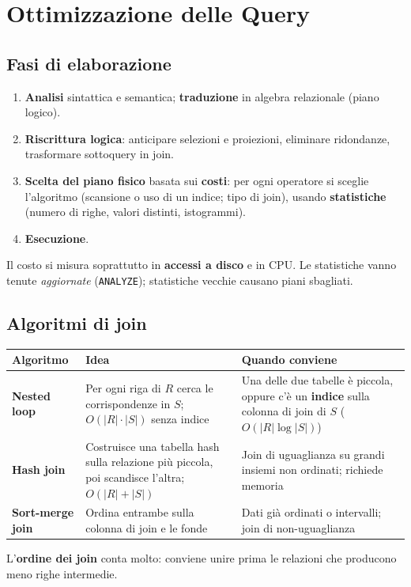 \section{Ottimizzazione delle Query}

\subsection{Fasi di elaborazione}
\begin{enumerate}
    \item \textbf{Analisi} sintattica e semantica; \textbf{traduzione} in algebra relazionale (piano logico).
    \item \textbf{Riscrittura logica}: anticipare selezioni e proiezioni, eliminare ridondanze, trasformare sottoquery in join.
    \item \textbf{Scelta del piano fisico} basata sui \textbf{costi}: per ogni operatore si sceglie l'algoritmo (scansione o uso di un indice; tipo di join), usando \textbf{statistiche} (numero di righe, valori distinti, istogrammi).
    \item \textbf{Esecuzione}.
\end{enumerate}
Il costo si misura soprattutto in \textbf{accessi a disco} e in CPU. Le statistiche vanno tenute \emph{aggiornate} (\texttt{ANALYZE}); statistiche vecchie causano piani sbagliati.

\subsection{Algoritmi di join}
\begin{center}
\small
\begin{tabularx}{\textwidth}{@{}>{\raggedright\arraybackslash}p{3cm}XX@{}}
\toprule
\textbf{Algoritmo} & \textbf{Idea} & \textbf{Quando conviene} \\
\midrule
\textbf{Nested loop} & Per ogni riga di $R$ cerca le corrispondenze in $S$; $O(|R|\cdot|S|)$ senza indice & Una delle due tabelle è piccola, oppure c'è un \textbf{indice} sulla colonna di join di $S$ ($O(|R|\log|S|)$) \\
\textbf{Hash join} & Costruisce una tabella hash sulla relazione più piccola, poi scandisce l'altra; $O(|R|+|S|)$ & Join di uguaglianza su grandi insiemi non ordinati; richiede memoria \\
\textbf{Sort-merge join} & Ordina entrambe sulla colonna di join e le fonde & Dati già ordinati o intervalli; join di non-uguaglianza \\
\bottomrule
\end{tabularx}
\end{center}
L'\textbf{ordine dei join} conta molto: conviene unire prima le relazioni che producono meno righe intermedie.

